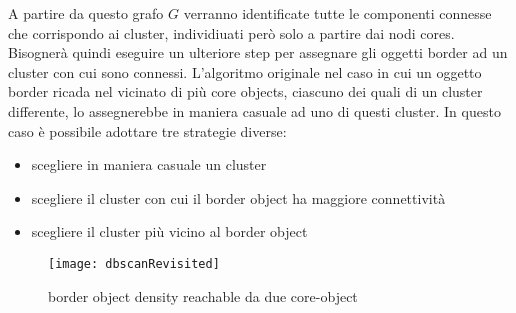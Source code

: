 A partire da questo grafo $G$ verranno identificate tutte le componenti connesse che corrispondo ai cluster, individiuati però solo a partire dai nodi cores. Bisognerà quindi eseguire un ulteriore step per assegnare gli oggetti border ad un cluster con cui sono connessi. L'algoritmo originale nel caso in cui un oggetto border   ricada nel vicinato di più core objects, ciascuno dei quali di un cluster differente, lo assegnerebbe in maniera  casuale ad uno di questi cluster. In questo caso è possibile adottare tre strategie diverse:
\begin{itemize}
\item scegliere in maniera casuale un cluster 
\item scegliere il cluster con cui il border object ha maggiore connettività 
\item scegliere il cluster più vicino al border object
\end{itemize}

\begin{figure}
\centering
\texttt{[image: dbscanRevisited]}
\caption{border object density reachable da due core-object}
\label{fig:dbscanGraphRevisited}
 \end{figure}
 
 


